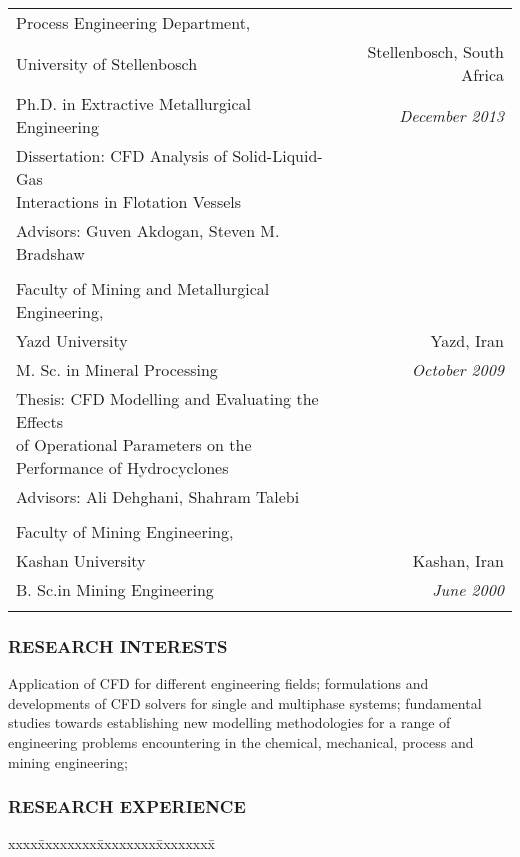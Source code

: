 \documentclass[10pt,a4]{article}
\newcommand{\quotes}[1]{``#1''}
\begin{document}
\begin{small}
\begin{tabbing}
\begin{tabular*}{0.97\linewidth}{l@{\extracolsep{\fill}}r}
Process Engineering Department, \\
University of Stellenbosch & Stellenbosch, South Africa\\
Ph.D. in  Extractive Metallurgical Engineering & 
{\it December 2013}\\
Dissertation: \quotes{CFD Analysis of Solid-Liquid-Gas \\Interactions in Flotation Vessels}\\
Advisors: Guven Akdogan, Steven M. Bradshaw \\
 & \\

Faculty of Mining and Metallurgical Engineering, \\
Yazd University & Yazd, Iran \\
M. Sc. in Mineral Processing &
{\it October 2009} \\
Thesis: \quotes{CFD Modelling and Evaluating the Effects \\of Operational Parameters
on the Performance of Hydrocyclones}\\
Advisors: Ali Dehghani, Shahram Talebi \\
 & \\

Faculty of Mining Engineering, \\
Kashan University & Kashan, Iran \\
B. Sc.in Mining Engineering &
{\it June 2000}\\
 & \\

\end{tabular*}
\end{tabbing}


\subsubsection*{RESEARCH INTERESTS}

\begin{list}{}{}
\item Application of CFD for different engineering fields; formulations and developments of CFD solvers for single and multiphase systems; fundamental studies towards establishing new modelling methodologies for a range of engineering problems encountering in the chemical, mechanical, process and mining engineering; 
\end{list}

\subsubsection*{RESEARCH EXPERIENCE}
%
\begin{tabbing}
xxxx\=xxxxxxxx\=xxxxxxxx\=xxxxxxxx\=\kill


\end{tabbing}
\end{small}
\end{document}
